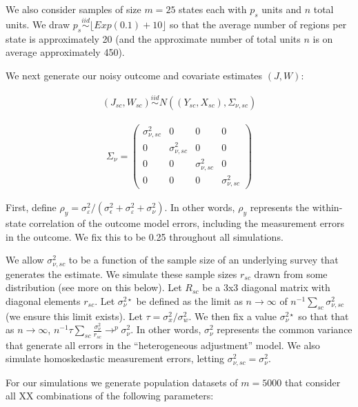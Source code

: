 We also consider samples of size $m = 25$ states each with $p_s$ units and $n$ total units. We draw $p_s \stackrel{iid}\sim \lfloor Exp(0.1) + 10\rfloor$ so that the average number of regions per state is approximately 20 (and the approximate number of total units $n$ is on average approximately 450).

We next generate our noisy outcome and covariate estimates $(J, W)$:

\begin{align*}
(J_{sc}, W_{sc}) \stackrel{iid}\sim N((Y_{sc}, X_{sc}), \Sigma_{\nu, sc})
\end{align*}

\begin{align*}
    \Sigma_{\nu} = \begin{pmatrix}
    \sigma^2_{\nu, sc} & 0 & 0 & 0 \\
    0 & \sigma^2_{\nu, sc} & 0 & 0 \\
    0 & 0 & \sigma^2_{\nu, sc} & 0 \\
    0 & 0 & 0 & \sigma^2_{\nu, sc}
    \end{pmatrix}
\end{align*}

First, define $\rho_y = \sigma^2_{\varepsilon}/(\sigma^2_{\epsilon} + \sigma^2_{\varepsilon} + \sigma^2_{\nu})$. In other words, $\rho_y$ represents the within-state correlation of the outcome model errors, including the measurement errors in the outcome. We fix this to be 0.25 throughout all simulations.

We allow $\sigma^2_{\nu, sc}$ to be a function of the sample size of an underlying survey that generates the estimate. We simulate these sample sizes $r_{sc}$ drawn from some distribution (see more on this below). Let $R_{sc}$ be a 3x3 diagonal matrix with diagonal elements $r_{sc}$. Let $\sigma_{\nu}^{2\star}$ be defined as the limit as $n \to \infty$ of $n^{-1}\sum_{sc}\sigma^2_{\nu, sc}$ (we ensure this limit exists). Let $\tau = \sigma^2_x/\sigma^2_w$. We then fix a value $\sigma_{\nu}^{2\star}$ so that that as $n \to \infty$, $n^{-1} \tau \sum_{sc}\frac{\sigma^2_{\nu}}{r_{sc}} \to^p \sigma^2_{\nu}$. In other words, $\sigma_{\nu}^2$ represents the common variance that generate all errors in the ``heterogeneous adjustment'' model. We also simulate homoskedastic measurement errors, letting $\sigma^2_{\nu, sc} = \sigma^2_{\nu}$. 

For our simulations we generate population datasets of $m = 5000$ that consider all XX combinations of the following parameters:

